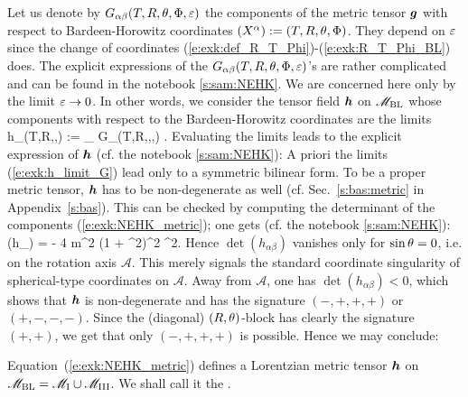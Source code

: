 Let us denote by $G_{\alpha\beta}(T,R,\theta,\Phi,\varepsilon)$ the components of
the metric tensor $\bm{g}$ with respect to Bardeen-Horowitz
coordinates $(X^\alpha):=(T,R,\theta,\Phi)$. They depend on $\varepsilon$
since the change of coordinates (\ref{e:exk:def_R_T_Phi})-(\ref{e:exk:R_T_Phi_BL})
does. The explicit expressions of the  $G_{\alpha\beta}(T,R,\theta,\Phi,\varepsilon)$'s are
rather complicated and can be found in
the notebook \ref{s:sam:NEHK}.
We are concerned here only by the limit $\varepsilon\to 0$. In other words, we
consider the tensor field $\bm{h}$ on $\mathscr{M}_{\rm BL}$ whose components with respect to the
Bardeen-Horowitz coordinates are the limits
\be \label{e:exk:h_limit_G}
    h_{\alpha\beta}(T,R,\th,\Phi) := \lim_{\veps{}} G_{\alpha\beta}(T,R,\th,\Phi,\veps) .
\ee
Evaluating the limits leads to the explicit expression
of $\bm{h}$ (cf. the notebook \ref{s:sam:NEHK}):
\be \label{e:exk:NEHK_metric}
\ee
A priori the limits (\ref{e:exk:h_limit_G}) lead only to a symmetric bilinear
form. To be a proper metric tensor, $\bm{h}$ has to be non-degenerate as well
(cf. Sec.~\ref{s:bas:metric} in Appendix~\ref{s:bas}). This can be checked by computing the
determinant of the components (\ref{e:exk:NEHK_metric}); one gets
(cf. the notebook \ref{s:sam:NEHK}):
\be
    \det (h_{\alpha\beta}) = - 4 m^2 (1 + \cos^2\th)^2 \sin^2\th .
\ee
Hence $\det (h_{\alpha\beta})$ vanishes only for $\sin\theta = 0$, i.e.
on the rotation axis $\mathscr{A}$. This merely signals the standard coordinate singularity of spherical-type coordinates on $\mathscr{A}$. Away from $\mathscr{A}$, one has $\det (h_{\alpha\beta}) < 0$, which
shows that $\bm{h}$ is non-degenerate and has the signature $(-,+,+,+)$ or $(+,-,-,-)$.
Since the (diagonal) $(R,\theta)$-block has clearly the signature $(+,+)$, we get
that only $(-,+,+,+)$ is possible. Hence we may conclude:
\begin{greybox}
Equation~(\ref{e:exk:NEHK_metric}) defines a Lorentzian metric tensor $\bm{h}$
on $\mathscr{M}_{\rm BL} = \mathscr{M}_{\rm I} \cup \mathscr{M}_{\rm III}$.
We shall call it the  .
\end{greybox}

